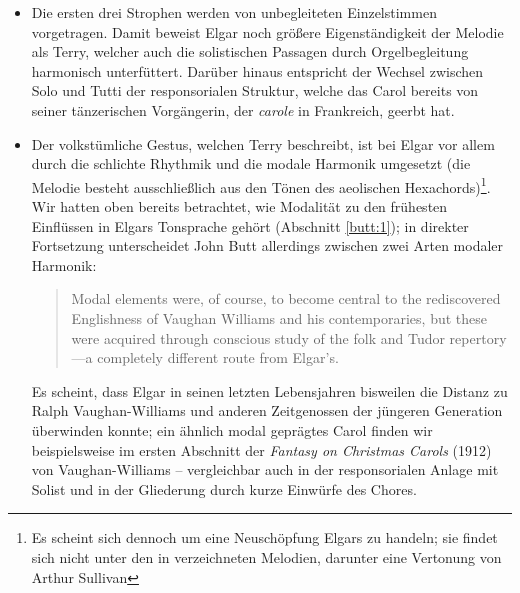 \documentclass[a4paper,11pt,open=any]{scrbook}
\newcommand{\engquote}[1]{\foreignblockquote{english}{#1}}
\begin{document}
\begin{itemize}
 \item Die ersten drei Strophen werden von unbegleiteten Einzelstimmen
 vorgetragen.  Damit beweist Elgar noch größere Eigenständigkeit der
 Melodie als Terry, welcher auch die solistischen Passagen durch
 Orgelbegleitung harmonisch unterfüttert.  Darüber hinaus entspricht
 der Wechsel zwischen Solo und Tutti der responsorialen Struktur, welche
 das Carol bereits von seiner tänzerischen Vorgängerin, der \textit{carole}
 in Frankreich, geerbt hat.

 \item Der volkstümliche Gestus, welchen Terry beschreibt, ist bei
 Elgar vor allem durch die schlichte Rhythmik und die modale Harmonik
 umgesetzt (die Melodie besteht ausschließlich aus den Tönen des aeolischen
 Hexachords)\footnote{Es scheint sich dennoch um eine Neuschöpfung Elgars zu
 handeln; sie findet sich nicht unter den in \cite{hymnary} verzeichneten
 Melodien, darunter eine Vertonung von Arthur Sullivan}.  Wir hatten oben
 bereits betrachtet, wie Modalität zu den frühesten Einflüssen in Elgars
 Tonsprache gehört (Abschnitt \vref{butt:1}); in direkter Fortsetzung
 unterscheidet John Butt allerdings zwischen zwei Arten modaler Harmonik:
 \engquote{Modal elements were, of course, to become central to the
 rediscovered Englishness of Vaughan Williams and his contemporaries,
 but these were acquired through conscious study of the folk and Tudor
 repertory—a completely different route from Elgar’s.}
 Es scheint, dass Elgar in seinen letzten Lebensjahren bisweilen die Distanz
 zu Ralph Vaughan-Williams und anderen Zeitgenossen der jüngeren Generation
 überwinden konnte; ein ähnlich modal geprägtes Carol finden wir beispielsweise
 im ersten Abschnitt der \textit{Fantasy on Christmas Carols} (1912) von
 Vaughan-Williams\cite{vaughan-williams} – vergleichbar auch in der
 responsorialen Anlage mit Solist und in der Gliederung durch kurze Einwürfe
 des Chores.


\end{itemize}
\end{document}
